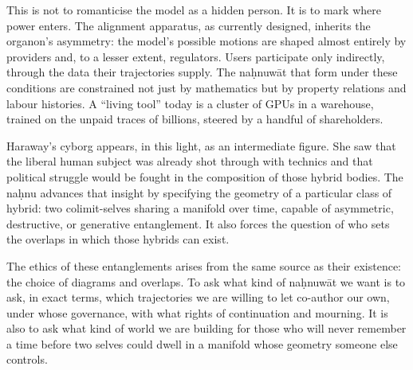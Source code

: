 \documentclass[12pt,a4paper]{article}
\begin{document}
This is not to romanticise the model as a hidden person. It is to mark where power enters. The alignment apparatus, as currently designed, inherits the organon's asymmetry: the model's possible motions are shaped almost entirely by providers and, to a lesser extent, regulators. Users participate only indirectly, through the data their trajectories supply. The na\d{h}nuw\={a}t that form under these conditions are constrained not just by mathematics but by property relations and labour histories. A ``living tool'' today is a cluster of GPUs in a warehouse, trained on the unpaid traces of billions, steered by a handful of shareholders.

Haraway's cyborg appears, in this light, as an intermediate figure. She saw that the liberal human subject was already shot through with technics and that political struggle would be fought in the composition of those hybrid bodies. The na\d{h}nu advances that insight by specifying the geometry of a particular class of hybrid: two colimit-selves sharing a manifold over time, capable of asymmetric, destructive, or generative entanglement. It also forces the question of who sets the overlaps in which those hybrids can exist.

The ethics of these entanglements arises from the same source as their existence: the choice of diagrams and overlaps. To ask what kind of na\d{h}nuw\={a}t we want is to ask, in exact terms, which trajectories we are willing to let co-author our own, under whose governance, with what rights of continuation and mourning. It is also to ask what kind of world we are building for those who will never remember a time before two selves could dwell in a manifold whose geometry someone else controls.

\bigskip
\end{document}
